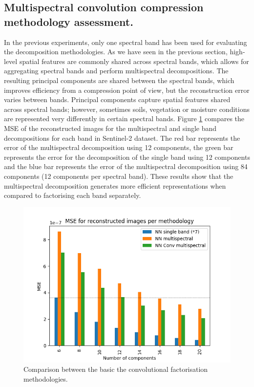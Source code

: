 \documentclass[essd, manuscript]{copernicus}
\begin{document}
\subsection{Multispectral convolution compression methodology assessment.}
In the previous experiments, only one spectral band has been used for evaluating the decomposition methodologies. As we have seen in the previous section, high-level spatial features are commonly shared across spectral bands, which allows for aggregating spectral bands and perform multispectral decompositions. The resulting principal components are shared between the spectral bands, which improves efficiency from a compression point of view, but the reconstruction error varies between bands. Principal components capture spatial features shared across spectral bands; however, sometimes soils, vegetation or moisture conditions are represented very differently in certain spectral bands. Figure \ref{multispectral_cmp} compares the MSE of the reconstructed images for the multispectral and single band decompositions for each band in Sentinel-2 dataset. The red bar represents the error of the multispectral decomposition using 12 components, the green bar represents the error for the decomposition of the single band using 12 components and the blue bar represents the error of the multispectral decomposition using 84 components (12 components per spectral band). These results show that the multispectral decomposition generates more efficient representations when compared to factorising each band separately. 

\begin{figure}
    \includegraphics[width=14cm]{fig8.png}
    \caption{Comparison between the basic the convolutional factorisation methodologies.}%
    \label{multispectral_cmp}%
\end{figure}
\end{document}
